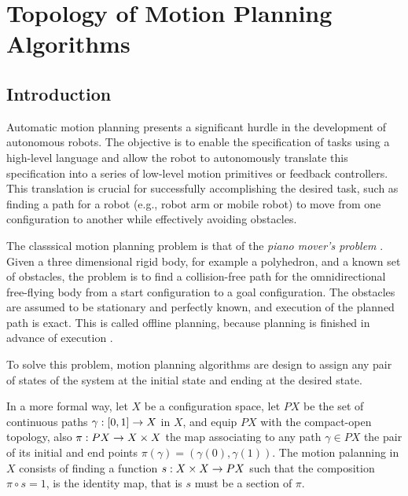\chapter{Topology of Motion Planning Algorithms}

\section{Introduction}

Automatic motion planning presents a significant hurdle in the development of autonomous robots. The objective is to enable the specification of tasks using a high-level language and allow the robot to autonomously translate this specification into a series of low-level motion primitives or feedback controllers. This translation is crucial for successfully accomplishing the desired task, such as finding a path for a robot (e.g., robot arm or mobile robot) to move from one configuration to another while effectively avoiding obstacles.

The classsical motion planning problem is that of the \textit{piano mover's problem} \cite{schwartz:1983a}. Given a three dimensional rigid body, for example a polyhedron, and a known set of obstacles, the problem is to find a collision-free path for the omnidirectional free-flying body from a start configuration to a goal configuration. The obstacles are assumed to be stationary and perfectly known, and execution of the planned path is exact. This is called offline planning, because planning is finished in advance of execution \cite{choset2005principles}.


To solve this problem, motion planning algorithms are design to assign any pair of states of the system at the initial state and ending at the desired state.

In a more formal way, let $X$ be a configuration space, let $PX$ be the set of continuous paths $\displaystyle \gamma : [0,1] \rightarrow X$ in $X$, and equip $PX$ with the compact-open topology, also $\pi : PX \rightarrow X \times X$ the map associating to any path $\gamma \in PX$ the pair of its initial and end points $\pi(\gamma) = (\gamma(0), \gamma(1))$. The motion palanning in $X$ consists of finding a function $s : X \times X \rightarrow PX$ such that the composition $\pi \circ s = 1$, is the identity map, that is $s$ must be a section of $\pi$.


